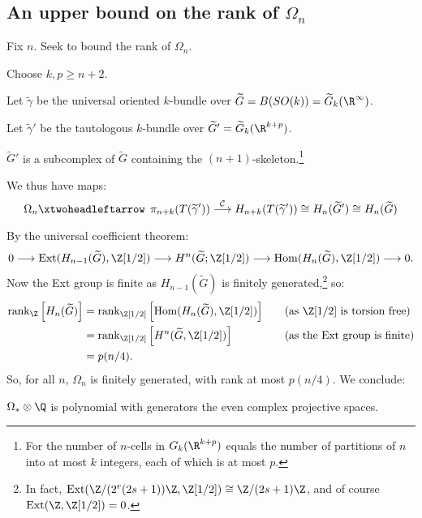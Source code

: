 \documentclass[11pt]{article}
\begin{document}
\begin{SignatureThmTalk}
\pagebreak
\subsection*{An upper bound on the rank of $\Omega_n$}
Fix $n$. Seek to bound the rank of $\Omega_n$.
\begin{itemise}
\item Choose $k,p\geq n+2$.
\item Let $\widetilde \gamma$ be the universal oriented $k$-bundle over $\widetilde G=B(SO(k))=\widetilde G_k(\R^\infty)$.
\item Let $\widetilde \gamma'$ be the tautologous $k$-bundle over $\widetilde G'=\widetilde G_k(\R^{k+p})$.
\item $\widetilde G'$ is a subcomplex of $\widetilde G$ containing the $(n+1)$-skeleton.\footnote{For the number of $n$-cells in $G_k(\R^{k+p})$ equals the number of partitions of $n$ into at most $k$ integers, each of which is at most $p$.}
\item We thus have maps:
\[\Omega_n\leftfibration\pi_{n+k}(T(\widetilde\gamma'))\overset{\calC}{\to}H_{n+k}(T(\widetilde\gamma'))\cong H_{n}(\widetilde G')\cong H_n(\widetilde G)\]
\item By the universal coefficient theorem:
\[0\to\Ext(H_{n-1}(\widetilde G),\Z[1/2])\to H^{n}(\widetilde G;\Z[1/2])\to \Hom(H_n(\widetilde G),\Z[1/2])\to0.\]
Now the Ext group is finite as $H_{n-1}(\widetilde G)$ is finitely generated,\footnote{In fact, $\Ext(\Z/(2^r(2s+1))\Z,\Z[1/2])\cong \Z/(2s+1)\Z$, and of course $\Ext(\Z,\Z[1/2])=0$.} so:
\begin{alignat*}{2}
\rank_\Z \left[H_n(\widetilde G)\right]&=\rank_{\Z[1/2]}\left[\Hom(H_n(\widetilde G),\Z[1/2])\right]&\quad&\text{(as $\Z[1/2]$ is torsion free)}\\
&=\rank_{\Z[1/2]}\left[H^n(\widetilde G,\Z[1/2])\right]&&\text{(as the $\Ext$ group is finite)}\\
&=p(n/4).
\end{alignat*}
So, for all $n$, $\Omega_n$ is finitely generated, with rank at most $p(n/4)$. We conclude:
\end{itemise}
\begin{thm*}
$\Omega_*\otimes\Q$ is polynomial with generators the even complex projective spaces.
\end{thm*}

\end{SignatureThmTalk}
\end{document}

